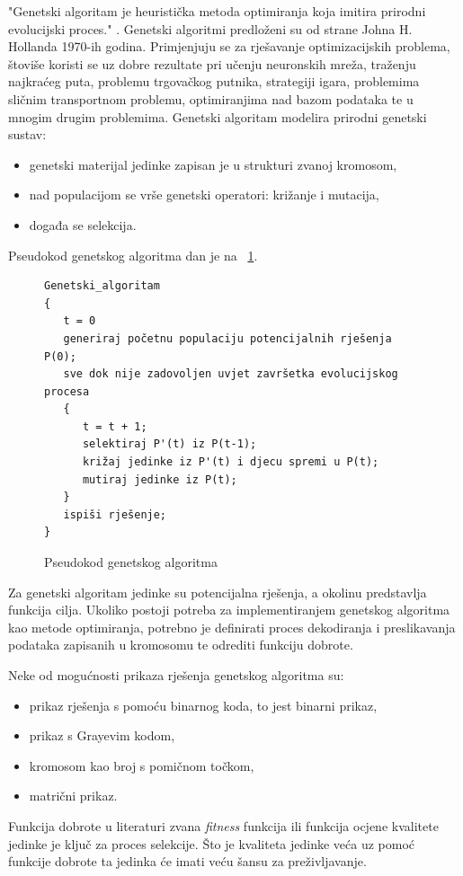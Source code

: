 \documentclass[times, utf8, zavrsni, numeric]{fer}
\begin{document}
"Genetski algoritam je heuristička metoda optimiranja koja imitira prirodni evolucijski proces." \cite{gaSkripta}. Genetski algoritmi predloženi su od strane Johna H. Hollanda 1970-ih godina. Primjenjuju se za rješavanje optimizacijskih problema, štoviše koristi se uz dobre rezultate pri učenju neuronskih mreža, traženju najkraćeg puta, problemu trgovačkog putnika, strategiji igara, problemima sličnim transportnom problemu, optimiranjima nad bazom podataka te u mnogim drugim problemima. Genetski algoritam modelira prirodni genetski sustav: 
\begin{itemize}
	\item genetski materijal jedinke zapisan je u strukturi zvanoj kromosom,
	\item nad populacijom se vrše genetski operatori: križanje i mutacija,
	\item događa se selekcija.
\end{itemize}
Pseudokod genetskog algoritma dan je na ~\ref{pseudoGen}.
\begin{figure}[h]
\begin{verbatim}
Genetski_algoritam
{
   t = 0
   generiraj početnu populaciju potencijalnih rješenja P(0);
   sve dok nije zadovoljen uvjet završetka evolucijskog procesa 
   {
      t = t + 1;
      selektiraj P'(t) iz P(t-1);
      križaj jedinke iz P'(t) i djecu spremi u P(t);
      mutiraj jedinke iz P(t);
   }
   ispiši rješenje;
}
\end{verbatim}
\caption{Pseudokod genetskog algoritma}
\label{pseudoGen}
\end{figure}

Za genetski algoritam jedinke su potencijalna rješenja, a okolinu predstavlja funkcija cilja. Ukoliko postoji potreba za implementiranjem genetskog algoritma kao metode optimiranja, potrebno je definirati proces dekodiranja i preslikavanja podataka zapisanih u kromosomu te odrediti funkciju dobrote.

Neke od mogućnosti prikaza rješenja genetskog algoritma su:
\begin{itemize}
	\item prikaz rješenja s pomoću binarnog koda, to jest binarni prikaz,
	\item prikaz s Grayevim kodom,
	\item kromosom kao broj s pomičnom točkom,
	\item matrični prikaz.
\end{itemize}

Funkcija dobrote u literaturi zvana \textit{fitness} funkcija ili funkcija ocjene kvalitete jedinke je ključ za proces selekcije. Što je kvaliteta jedinke veća uz pomoć funkcije dobrote ta jedinka će imati veću šansu za preživljavanje. 
\end{document}
